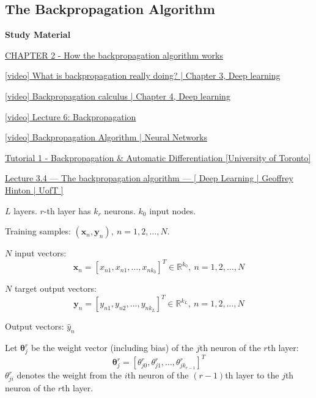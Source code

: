 \documentclass{article}
\begin{document}
\begin{multicols}{2}
\subsection{The Backpropagation Algorithm}

\begin{mdframed}
	\textbf{Study Material}

	\href{http://neuralnetworksanddeeplearning.com/chap2.html}{CHAPTER 2 - How the backpropagation algorithm works}

	\href{https://www.youtube.com/watch?v=Ilg3gGewQ5U&list=PLZHQObOWTQDNU6R1\_67000Dx\_ZCJB-3pi&index=3}{[video] What is backpropagation really doing? | Chapter 3, Deep learning}

	\href{https://www.youtube.com/watch?v=tIeHLnjs5U8&list=PLZHQObOWTQDNU6R1\_67000Dx\_ZCJB-3pi&index=4}{[video] Backpropagation calculus | Chapter 4, Deep learning}

	\href{https://www.youtube.com/watch?v=dB-u77Y5a6A}{[video] Lecture 6: Backpropagation}

	\href{https://www.youtube.com/watch?v=sIX\_9n-1UbM}{[video] Backpropagation Algorithm | Neural Networks}

	\href{https://www.cs.toronto.edu/~rgrosse/courses/csc2541\_2022/tutorials/tut01.pdf}{Tutorial 1 - Backpropagation \& Automatic Differentiation [University of Toronto]}

	\href{https://www.youtube.com/watch?v=VCT1N0EsGj0&list=PLLssT5z\_DsK\_gyrQ\_biidwvPYCRNGI3iv&index=14}{Lecture 3.4 — The backpropagation algorithm — [ Deep Learning | Geoffrey Hinton | UofT ]}
\end{mdframed}

$L$ layers.
$r$-th layer has $k_r$ neurons.
$k_0$ input nodes.

Training samples: $(\symbf{x}_n, \symbf{y}_n),\ n=1, 2, \ldots, N$.

$N$ input vectors:
\[\symbf{x}_n = [x_{n 1}, x_{n 1}, \ldots , x_{n k_0}]^T \in \mathbb{R}^{k_0},\ n = 1, 2, \ldots, N\]

$N$ target output vectors:
\[\symbf{y}_n = [y_{n 1}, y_{n 2}, \ldots , y_{n k_L}]^T \in \mathbb{R}^{k_L},\ n = 1, 2, \ldots, N\]

Output vectors: $\hat y_n$

Let $\symbf{\theta}_j^r$ be the weight vector (including bias) of the $j$th neuron of the $r$th layer:
\[\symbf{\theta}_j^r = [\theta_{j0}^r, \theta_{j1}^r, \ldots, \theta_{jk_{r-1}}^r]^T\]
$\theta_{ji}^r$ denotes the weight from the $i$th neuron of the $(r-1)$th layer to the $j$th neuron of the $r$th layer.


\end{multicols}
\end{document}
